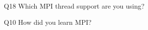 \begin{description}%
\item{Q18} Which MPI thread support are you using?%
\item{Q10} How did you learn MPI?%
\end{description}%
